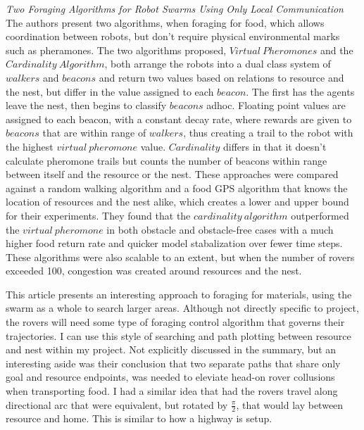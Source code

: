 \textit{Two Foraging Algorithms for Robot Swarms Using Only Local Communication}~\cite{hoff2010two} \\

The authors present two algorithms, when foraging for food, which allows coordination between robots, but don't require physical environmental marks such as pheramones. The two algorithms proposed, $Virtual~Pheromones$ and the $Cardinality~Algorithm$, both arrange the robots into a dual class system of $walkers$ and $beacons$ and return two values based on relations to resource and the nest, but differ in the value assigned to each $beacon$. The first has the agents leave the nest, then begins to classify $beacons$ adhoc. Floating point values are assigned to each beacon, with a constant decay rate, where rewards are given to $beacons$ that are within range of $walkers$, thus creating a trail to the robot with the highest $virtual~pheromone$ value.  $Cardinality$ differs in that it doesn't calculate pheromone trails but counts the number of beacons within range between itself and the resource or the nest. These approaches were compared against a random walking algorithm and a food GPS algorithm that knows the location of resources and the nest alike, which creates a lower and upper bound for their experiments. They found that the $cardinality~algorithm$ outperformed the $virtual~pheromone$ in both obstacle and obstacle-free cases with a much higher food return rate and quicker model stabalization over fewer time steps. These algorithms were also scalable to an extent, but when the number of rovers exceeded 100, congestion was created around resources and the nest.

This article presents an interesting approach to foraging for materials, using the swarm as a whole to search larger areas. Although not directly specific to project, the rovers will need some type of foraging control algorithm that governs their trajectories. I can use this style of searching and path plotting between resource and nest within my project. Not explicitly discussed in the summary, but an interesting aside was their conclusion that two separate paths that share only goal and resource endpoints, was needed to eleviate head-on rover collusions when transporting food. I had a similar idea that had the rovers travel along directional arc that were equivalent, but rotated by $\frac{\pi}{2}$, that would lay between resource and home. This is similar to how a highway is setup.